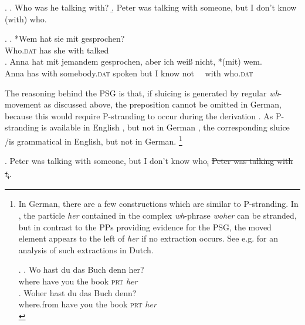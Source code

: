 \ex.
\a. Who was he talking with? \label{pst-english-question}\hfill \citep[666]{merchant2004}
\b. Peter was talking with someone, but I don’t know (with) who.

\ex. 
\ag. *Wem hat sie mit gesprochen?\label{ex:pst-german-q}\\
Who.\textsc{dat} has she with talked\\
\bg. Anna hat mit jemandem gesprochen, aber ich wei\ss {} nicht, *(mit) wem. \hfill\\
Anna has with somebody.\textsc{dat} spoken but I know not \mbox{~~}with who.\textsc{dat}\\

The reasoning behind the PSG is that, if sluicing is generated by regular \textit{wh}-movement as discussed above, the preposition cannot be omitted in German, because this would require P-stranding to occur during the derivation \Next. As P-stranding is available in English \LLast[a], but not in German \Last[a], the corresponding sluice \LLast[b]/\Last[b] is grammatical in English, but not in German.%
%
\footnote{In German, there are a few constructions which are similar to P-stranding. In \Next, the particle \textit{her} contained in the complex \textit{wh}-phrase \textit{woher} can be stranded, but in contrast to the PPs providing evidence for the PSG, the moved element appears to the left of \textit{her} if no extraction occurs. See e.g. \citet{vanriemsdijk1978} for an analysis of such extractions in Dutch.

\ex. \ag. Wo hast du das Buch denn her?\\
	  where have you the book \textsc{prt} \textit{her}\\ 
\bg. Woher hast du das Buch denn?\\
	  where.from have you the book \textsc{prt} \textit{her}\\ 

}\afterfn%
%

\ex. Peter was talking with someone, but I don't know who\textsubscript{i} \sout{Peter was talking with \textit{t}\textsubscript{i}}.

